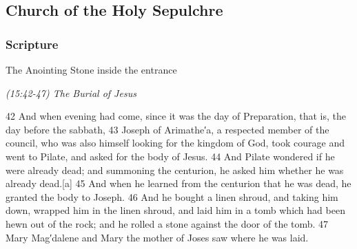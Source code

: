 \documentclass[letterpaper]{report}
\begin{document}
\clearpage
\subsection{Church of the Holy Sepulchre}
\begin{multicols}{2}
	\mbox{}
\end{multicols}
\subsubsection{Scripture}
{\centering
	The Anointing Stone inside the entrance
	
	\emph{(15:42-47) The Burial of Jesus}\\
}
\begin{multicols}{2}
	42 And when evening had come, since it was the day of Preparation, that is, the day before the sabbath, 43 Joseph of Arimathe′a, a respected member of the council, who was also himself looking for the kingdom of God, took courage and went to Pilate, and asked for the body of Jesus. 44 And Pilate wondered if he were already dead; and summoning the centurion, he asked him whether he was already dead.[a] 45 And when he learned from the centurion that he was dead, he granted the body to Joseph. 46 And he bought a linen shroud, and taking him down, wrapped him in the linen shroud, and laid him in a tomb which had been hewn out of the rock; and he rolled a stone against the door of the tomb. 47 Mary Mag′dalene and Mary the mother of Joses saw where he was laid.
\end{multicols}
\end{document}
